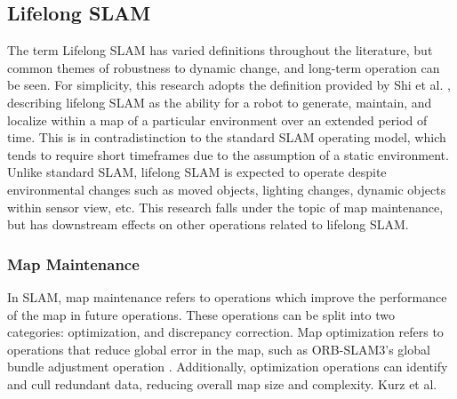 \subsection{Lifelong SLAM}

The term Lifelong SLAM has varied definitions throughout the literature, but common themes of robustness to dynamic change, and long-term operation can be seen. For simplicity, this research adopts the definition provided by Shi et al. \cite{shiAreWeReady2020}, describing lifelong SLAM as the ability for a robot to generate, maintain, and localize within a map of a particular environment over an extended period of time. This is in contradistinction to the standard SLAM operating model, which tends to require short timeframes due to the assumption of a static environment. Unlike standard SLAM, lifelong SLAM is expected to operate despite environmental changes such as moved objects, lighting changes, dynamic objects within sensor view, etc. This research falls under the topic of map maintenance, but has downstream effects on other operations related to lifelong SLAM.

\subsubsection{Map Maintenance}

In SLAM, map maintenance refers to operations which improve the performance of the map in future operations. These operations can be split into two categories: optimization, and discrepancy correction. Map optimization refers to operations that reduce global error in the map, such as ORB-SLAM3's global bundle adjustment operation \cite{camposORBSLAM3AccurateOpenSource2021}. Additionally, optimization operations can identify and cull redundant data, reducing overall map size and complexity. Kurz et al.